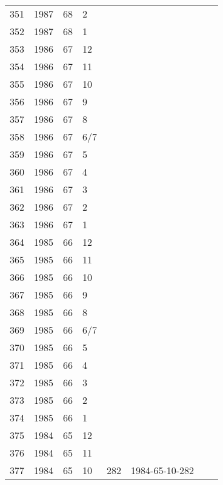 \begin{longtable}{ |l|l|l|l|l|l|l|l| }
351 & 1987 & 68 &     2 &         &                &  & \\
352 & 1987 & 68 &     1 &         &                &  & \\
353 & 1986 & 67 &    12 &         &                &  & \\
354 & 1986 & 67 &    11 &         &                &  & \\
355 & 1986 & 67 &    10 &         &                &  & \\
356 & 1986 & 67 &     9 &         &                &  & \\
357 & 1986 & 67 &     8 &         &                &  & \\
358 & 1986 & 67 &   6/7 &         &                &  & \\
359 & 1986 & 67 &     5 &         &                &  & \\
360 & 1986 & 67 &     4 &         &                &  & \\
361 & 1986 & 67 &     3 &         &                &  & \\
362 & 1986 & 67 &     2 &         &                &  & \\
363 & 1986 & 67 &     1 &         &                &  & \\
364 & 1985 & 66 &    12 &         &                &  & \\
365 & 1985 & 66 &    11 &         &                &  & \\
366 & 1985 & 66 &    10 &         &                &  & \\
367 & 1985 & 66 &     9 &         &                &  & \\
368 & 1985 & 66 &     8 &         &                &  & \\
369 & 1985 & 66 &   6/7 &         &                &  & \\
370 & 1985 & 66 &     5 &         &                &  & \\
371 & 1985 & 66 &     4 &         &                &  & \\
372 & 1985 & 66 &     3 &         &                &  & \\
373 & 1985 & 66 &     2 &         &                &  & \\
374 & 1985 & 66 &     1 &         &                &  & \\
375 & 1984 & 65 &    12 &         &                &  & \\
376 & 1984 & 65 &    11 &         &                &  & \\
377 & 1984 & 65 &    10 &     282 & 1984-65-10-282 &  & \\

\end{longtable}
